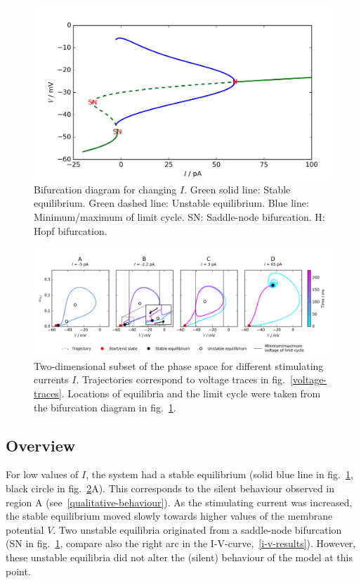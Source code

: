 \documentclass[12pt,a4paper,]{report}
\begin{document}
\begin{figure}
\centering
\includegraphics[]{images/bifurcation.png}
\caption[Bifurcation diagram for changing $I$]{Bifurcation diagram for changing $I$. Green solid line:
Stable equilibrium. Green dashed line: Unstable equilibrium. Blue line:
Minimum/maximum of limit cycle. SN: Saddle-node bifurcation. H: Hopf
bifurcation.}\label{bifurcation-diagram}
\end{figure}

\begin{figure}
\centering
\includegraphics[]{images/phase_space.png}
\caption[Two-dimensional subset of the phase space for different
stimulating currents $I$]{Two-dimensional subset of the phase space for different
stimulating currents $I$. Trajectories correspond to voltage traces
in fig.~\ref{voltage-traces}. Locations of equilibria and the limit
cycle were taken from the bifurcation diagram in
fig.~\ref{bifurcation-diagram}.}\label{phase-space-plots}
\end{figure}

\subsection{Overview}\label{overview}

For low values of $I$, the system had a stable equilibrium (solid blue
line in fig.~\ref{bifurcation-diagram}, black circle in
fig.~\ref{phase-space-plots}A). This corresponds to the silent behaviour
observed in region A (see~\ref{qualitative-behaviour}). As the
stimulating current was increased, the stable equilibrium moved slowly
towards higher values of the membrane potential $V$. Two unstable
equilibria originated from a saddle-node bifurcation (SN in
fig.~\ref{bifurcation-diagram}, compare also the right arc in the
I-V-curve,~\ref{i-v-results}). However, these unstable equilibria did
not alter the (silent) behaviour of the model at this point.
\end{document}
